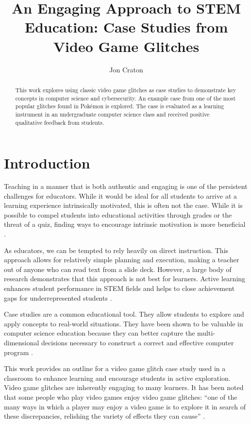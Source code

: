 \documentclass[letterpaper]{article}
\title{An Engaging Approach to STEM Education: Case Studies from Video Game Glitches}
\author[1]{Jon Craton}
\affil[1]{Anderson University, Anderson, IN}
\date{} %
\begin{document}
\maketitle

\begin{abstract}
This work explores using classic video game glitches as case studies to demonstrate key concepts in computer science and cybersecurity. An example case from one of the most popular glitches found in Pokémon is explored. The case is evaluated as a learning instrument in an undergraduate computer science class and received positive qualitative feedback from students.
\end{abstract}

\section{Introduction}
Teaching in a manner that is both authentic and engaging is one of the persistent challenges for educators. While it would be ideal for all students to arrive at a learning experience intrinsically motivated, this is often not the case. While it is possible to compel students into educational activities through grades or the threat of a quiz, finding ways to encourage intrinsic motivation is more beneficial \cite{deci2013intrinsic}.

As educators, we can be tempted to rely heavily on direct instruction. This approach allows for relatively simple planning and execution, making a teacher out of anyone who can read text from a slide deck. However, a large body of research demonstrates that this approach is not best for learners. Active learning enhances student performance in STEM fields \cite{freeman2014active} and helps to close achievement gaps for underrepresented students \cite{theobald2020active}.

Case studies are a common educational tool. They allow students to explore and apply concepts to real-world situations. They have been shown to be valuable in computer science education because they can better capture the multi-dimensional decisions necessary to construct a correct and effective computer program \cite{linn1992case}.

This work provides an outline for a video game glitch case study used in a classroom to enhance learning and encourage students in active exploration. Video game glitches are inherently engaging to many learners. It has been noted that some people who play video games enjoy video game glitches: ``one of the many ways in which a player may enjoy a video game is to explore it in search of these discrepancies, relishing the variety of effects they can cause'' \cite{bainbridge2007creative}.
\end{document}
